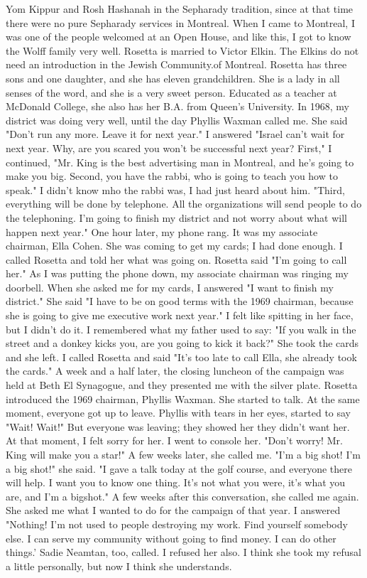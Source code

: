 Yom Kippur and Rosh Hashanah in the Sepharady tradition, since at that time 
there were no pure Sepharady services in Montreal. When I came to Montreal, 
I was one of the people welcomed at an Open House, and like this, I got to 
know the Wolff family very well. 
Rosetta is married to Victor Elkin. The Elkins do not need an introduction in the Jewish Community.of Montreal. Rosetta has three sons and 
one daughter, and she has eleven grandchildren. She is a lady in all senses of the word, and she is a very sweet person. Educated as a teacher at 
McDonald College, she also has her B.A. from Queen's University. 
In 1968, my district was doing very well, until the day Phyllis Waxman called me. She said "Don't run any more. Leave it for next year." I answered "Israel can't wait for next year. Why, are 
you scared you won't be successful next year? First," I continued, "Mr. 
King is the best advertising man in Montreal, and he's going to make you 
big. Second, you have the rabbi, who is going to teach you how to speak." 
I didn't know mho the rabbi was, I had just heard about him. "Third, 
everything will be done by telephone. All the organizations will send people to do the telephoning. I'm going to finish my district and not worry about what will happen next year." 
One hour later, my phone rang. It was my associate chairman, Ella Cohen. She was coming to get my cards; I had done enough. I called Rosetta and told her what was going on. Rosetta said "I'm going to call her." 
As I was putting the phone down, my associate chairman was ringing my doorbell. When she asked me for my cards, I answered "I want to finish my district." She said "I have to be on good terms with the 1969 chairman, because she is going to give me executive work next year." I felt like spitting in her face, but I didn't do it. I remembered what my father used to 
say: "If you walk in the street and a donkey kicks you, are you going to 
kick it back?" She took the cards and she left. 
I called Rosetta and said "It's too late to call Ella, she already 
took the cards." A week and a half later, the closing luncheon of the campaign was held at Beth El Synagogue, and they presented me with the silver 
plate. Rosetta introduced the 1969 chairman, Phyllis Waxman. She started to talk. At the same moment, everyone got up to leave. Phyllis with 
tears in her eyes, started to say "Wait! Wait!" But everyone was leaving; 
they showed her they didn't want her. At that moment, I felt sorry for her. 
I went to console her. "Don't worry! Mr. King will make you a star!" 
A few weeks later, she called me. "I'm a big shot! I'm a big shot!" 
she said. "I gave a talk today at the golf course, and everyone there will 
help. I want you to know one thing. It's not what you were, it's what you 
are, and I'm a bigshot." 
A few weeks after this conversation, she called me again. She asked 
me what I wanted to do for the campaign of that year. I answered "Nothing! 
I'm not used to people destroying my work. Find yourself somebody else. I can serve my community without going to find money. I can do other things.' 
Sadie Neamtan, too, called. I refused her also. I think she took my refusal a little personally, but now I think she understands. 

